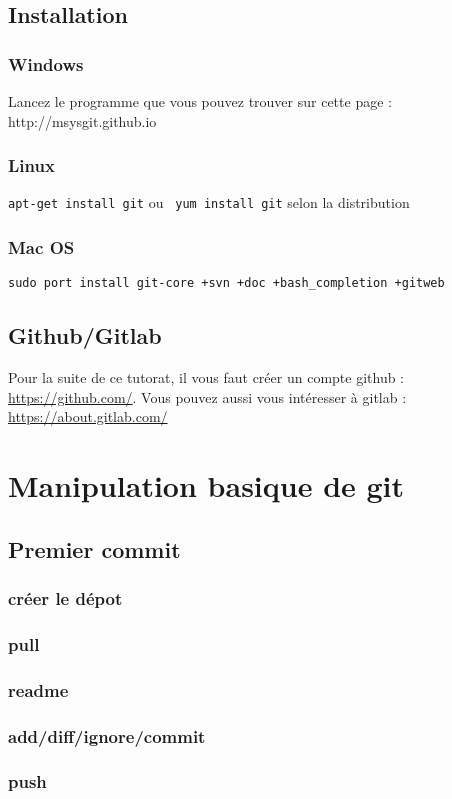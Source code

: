 \documentclass[a4paper,10pt]{article}
\begin{document}
  \subsection{Installation}
    \subsubsection{Windows}
Lancez le programme que vous pouvez trouver sur cette page : http://msysgit.github.io
    \subsubsection{Linux}
\verb|apt-get install git| ou \verb| yum install git| selon la distribution
    \subsubsection{Mac OS}
\verb|sudo port install git-core +svn +doc +bash_completion +gitweb|
  \subsection{Github/Gitlab}
Pour la suite de ce tutorat, il vous faut créer un compte github : \url{https://github.com/}.
Vous pouvez aussi vous intéresser à gitlab : \url{https://about.gitlab.com/}
\section{Manipulation basique de git}
  \subsection{Premier commit}
     \subsubsection{créer le dépot}
     \subsubsection{pull}
     \subsubsection{readme}
     \subsubsection{add/diff/ignore/commit}
     \subsubsection{push}
\end{document}
